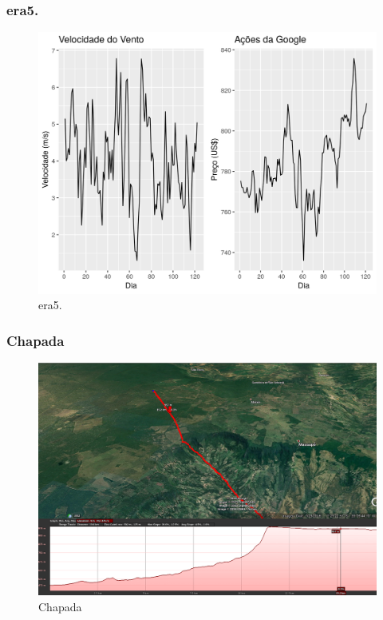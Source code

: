 \documentclass{beamer}
\begin{document}
\begin{frame}
	\frametitle{era5.}
	\begin{figure}
		\centering
		\includegraphics[width=\textwidth]{wind_money}
		\caption{era5.}
	\end{figure}
\end{frame}

\begin{frame}
	\frametitle{Chapada}
	\begin{figure}
		\centering
		\includegraphics[width=\textwidth]{elevation2}
		\caption{Chapada}
	\end{figure}
\end{frame}
\end{document}
